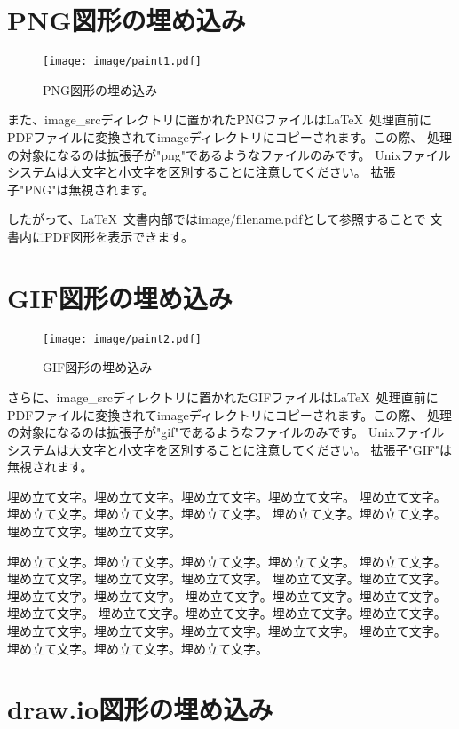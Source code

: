 \section{PNG図形の埋め込み}

\begin{wrapfigure}[10]{O}[0pt]{0\textwidth}
    \texttt{[image: image/paint1.pdf]}
    \caption{PNG図形の埋め込み}\label{embeded_png}
\end{wrapfigure}

また、image\_srcディレクトリに置かれたPNGファイルは\LaTeX\
処理直前にPDFファイルに変換されてimageディレクトリにコピーされます。この際、
処理の対象になるのは拡張子が"png"であるようなファイルのみです。
Unixファイルシステムは大文字と小文字を区別することに注意してください。
拡張子"PNG"は無視されます。

したがって、\LaTeX\ 文書内部ではimage/filename.pdfとして参照することで
文書内にPDF図形を表示できます。

\section{GIF図形の埋め込み}

\begin{wrapfigure}[10]{O}[0pt]{0\textwidth}
    \texttt{[image: image/paint2.pdf]}
    \caption{GIF図形の埋め込み}\label{embeded_gif}
\end{wrapfigure}

さらに、image\_srcディレクトリに置かれたGIFファイルは\LaTeX\
処理直前にPDFファイルに変換されてimageディレクトリにコピーされます。この際、
処理の対象になるのは拡張子が"gif"であるようなファイルのみです。
Unixファイルシステムは大文字と小文字を区別することに注意してください。
拡張子"GIF"は無視されます。

埋め立て文字。埋め立て文字。埋め立て文字。埋め立て文字。
埋め立て文字。埋め立て文字。埋め立て文字。埋め立て文字。
埋め立て文字。埋め立て文字。埋め立て文字。埋め立て文字。

埋め立て文字。埋め立て文字。埋め立て文字。埋め立て文字。
埋め立て文字。埋め立て文字。埋め立て文字。埋め立て文字。
埋め立て文字。埋め立て文字。埋め立て文字。埋め立て文字。
埋め立て文字。埋め立て文字。埋め立て文字。埋め立て文字。
埋め立て文字。埋め立て文字。埋め立て文字。埋め立て文字。
埋め立て文字。埋め立て文字。埋め立て文字。埋め立て文字。
埋め立て文字。埋め立て文字。埋め立て文字。埋め立て文字。


\section{draw.io図形の埋め込み}

